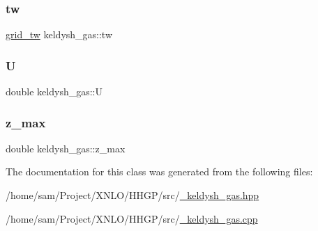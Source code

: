 \mbox{\label{classkeldysh__gas_a1cd7129f9ba9d62f4084049e529cab49}} 
\subsubsection{\texorpdfstring{tw}{tw}}
{\footnotesize\ttfamily \hyperlink{classgrid__tw}{grid\+\_\+tw} keldysh\+\_\+gas\+::tw\hspace{0.3cm}{\ttfamily [private]}}

\mbox{\label{classkeldysh__gas_a752b70afe289a798cc0ab7b688b9ed3d}} 
\subsubsection{\texorpdfstring{U}{U}}
{\footnotesize\ttfamily double keldysh\+\_\+gas\+::U}

\mbox{\label{classkeldysh__gas_a117691dd8b6fd06b34a73392c0e73e32}} 
\subsubsection{\texorpdfstring{z\+\_\+max}{z\_max}}
{\footnotesize\ttfamily double keldysh\+\_\+gas\+::z\+\_\+max}



The documentation for this class was generated from the following files\+:\begin{DoxyCompactItemize}
\item 
/home/sam/\+Project/\+X\+N\+L\+O/\+H\+H\+G\+P/src/\hyperlink{__keldysh__gas_8hpp}{\+\_\+keldysh\+\_\+gas.\+hpp}\item 
/home/sam/\+Project/\+X\+N\+L\+O/\+H\+H\+G\+P/src/\hyperlink{__keldysh__gas_8cpp}{\+\_\+keldysh\+\_\+gas.\+cpp}\end{DoxyCompactItemize}
